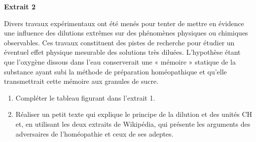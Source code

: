 \vspace{0.4cm}

\textbf{Extrait 2 }

Divers travaux expérimentaux ont été menés pour tenter de mettre en évidence une influence des dilutions extrêmes sur des phénomènes physiques ou chimiques observables. Ces travaux constituent des pistes de recherche pour étudier un éventuel effet physique mesurable des solutions très diluées. L’hypothèse étant que l’oxygène dissous dans l’eau conserverait une « mémoire » statique de la substance ayant subi la méthode de préparation homéopathique et qu’elle transmettrait cette mémoire aux granules de sucre.

\begin{enumerate}
\item Compléter le tableau figurant dans l'extrait 1.
\item Réaliser un petit texte qui explique le principe de la dilution et des unités CH et, en utilisant les deux extraits de Wikipédia, qui présente les arguments des adversaires de l’homéopathie et ceux de ses adeptes.

\end{enumerate}
